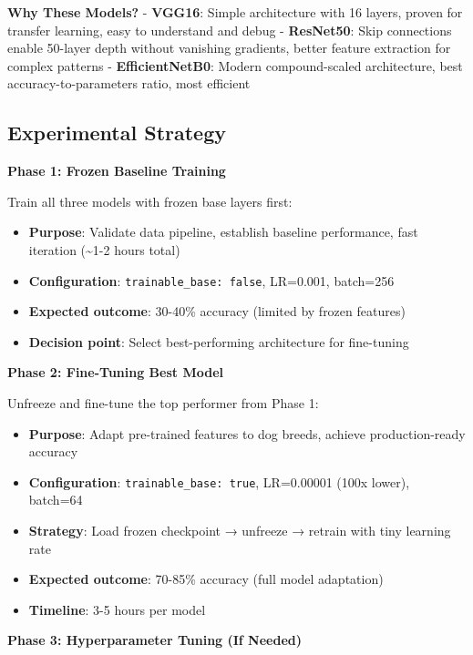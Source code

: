 \documentclass[
  letterpaper,
  DIV=11,
  numbers=noendperiod]{scrartcl}
\providecommand{\tightlist}{%
  \setlength{\itemsep}{0pt}\setlength{\parskip}{0pt}}
\begin{document}
\textbf{Why These Models?} - \textbf{VGG16}: Simple architecture with 16
layers, proven for transfer learning, easy to understand and debug -
\textbf{ResNet50}: Skip connections enable 50-layer depth without
vanishing gradients, better feature extraction for complex patterns -
\textbf{EfficientNetB0}: Modern compound-scaled architecture, best
accuracy-to-parameters ratio, most efficient

\subsection{Experimental Strategy}\label{experimental-strategy}

\textbf{Phase 1: Frozen Baseline Training}

Train all three models with frozen base layers first:

\begin{itemize}
\tightlist
\item
  \textbf{Purpose}: Validate data pipeline, establish baseline
  performance, fast iteration (\textasciitilde1-2 hours total)
\item
  \textbf{Configuration}: \texttt{trainable\_base:\ false}, LR=0.001,
  batch=256
\item
  \textbf{Expected outcome}: 30-40\% accuracy (limited by frozen
  features)
\item
  \textbf{Decision point}: Select best-performing architecture for
  fine-tuning
\end{itemize}

\textbf{Phase 2: Fine-Tuning Best Model}

Unfreeze and fine-tune the top performer from Phase 1:

\begin{itemize}
\tightlist
\item
  \textbf{Purpose}: Adapt pre-trained features to dog breeds, achieve
  production-ready accuracy
\item
  \textbf{Configuration}: \texttt{trainable\_base:\ true}, LR=0.00001
  (100x lower), batch=64
\item
  \textbf{Strategy}: Load frozen checkpoint → unfreeze → retrain with
  tiny learning rate
\item
  \textbf{Expected outcome}: 70-85\% accuracy (full model adaptation)
\item
  \textbf{Timeline}: 3-5 hours per model
\end{itemize}

\textbf{Phase 3: Hyperparameter Tuning (If Needed)}
\end{document}
